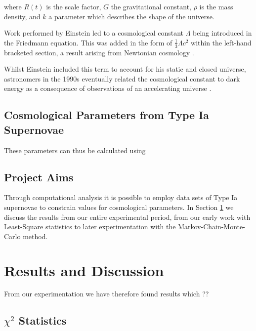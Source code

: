 \documentclass[twocolumn]{revtex4}
\begin{document}
where $R(t)$ is the scale factor, $G$ the gravitational constant, $\rho$ is the mass density, and $k$ a parameter which describes the shape of the universe. 

Work performed by Einstein led to a cosmological constant $\Lambda$ being introduced in the Friedmann equation. This was added in the form of $\tfrac{1}{3}\Lambda c^2$ within the left-hand bracketed section, a result arising from Newtonian cosmology \cite{mod_ast}.

Whilst Einstein included this term to account for his static and closed universe, astronomers in the 1990s eventually related the cosmological constant to dark energy as a consequence of observations of an accelerating universe \cite{mod_ast}. 

\vspace{-3ex}
\subsection{Cosmological Parameters from Type Ia Supernovae}
\vspace{-2ex}
These parameters can thus be calculated using 

\vspace{-3ex}
\subsection{Project Aims}
\vspace{-2ex}

Through computational analysis it is possible to employ data sets of Type Ia supernovae to constrain values for cosmological parameters. In Section \ref{sec:results_discussion} we discuss the results from our entire experimental period, from our early work with Least-Square statistics to later experimentation with the Markov-Chain-Monte-Carlo method. 

\vspace{-3ex}
\section{Results and Discussion} 
\label{sec:results_discussion}
\vspace{-2ex}
From our experimentation we have therefore found results which ??

\vspace{-3ex}
\subsection{$\chi^2$ Statistics} 
\vspace{-2ex}
\end{document}
